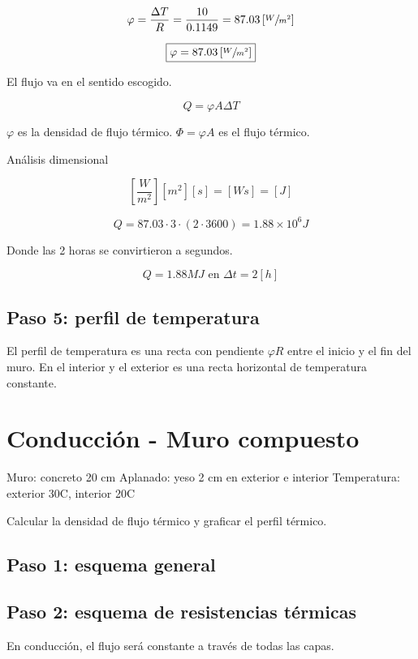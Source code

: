 \documentclass[11pt]{article}
\begin{document}
\[ \varphi = \frac{ \Delta T }{ R } = \frac{ 10 }{ 0.1149 } = 87.03 \left[ \sfrac{ W }{ m ^ 2 } \right] \]

\[ \boxed{ \varphi = 87.03 \left[ \sfrac{ W }{ m ^ 2 } \right] } \]

El flujo va en el sentido escogido.

\[ Q = \varphi A \Delta T \]

$ \varphi $ es la densidad de flujo térmico. $ \Phi = \varphi A $ es el flujo térmico.

Análisis dimensional

\[ \left[ \frac{ W }{ m ^ 2 } \right] \left[ m ^ 2 \right] \left[ s \right] = \left[ W s \right] = \left[ J \right] \]

\[ Q = 87.03 \cdot 3 \cdot \left( 2 \cdot 3600 \right) = 1.88 \times 10 ^ 6 J  \]

Donde las 2 horas se convirtieron a segundos.

\[ Q = 1.88 MJ \text{ en } \Delta t = 2 \left[ h \right] \]

\subsection{Paso 5: perfil de temperatura}

El perfil de temperatura es una recta con pendiente $ \varphi R $ entre el inicio y el fin del muro. En el interior y el exterior es una recta horizontal de temperatura constante.

\section{Conducción - Muro compuesto}

Muro: concreto 20 cm
Aplanado: yeso 2 cm en exterior e interior
Temperatura: exterior 30\degree C, interior 20\degree C

Calcular la densidad de flujo térmico y graficar el perfil térmico.

\subsection{Paso 1: esquema general}

\subsection{Paso 2: esquema de resistencias térmicas}

En conducción, el flujo será constante a través de todas las capas.
\end{document}
